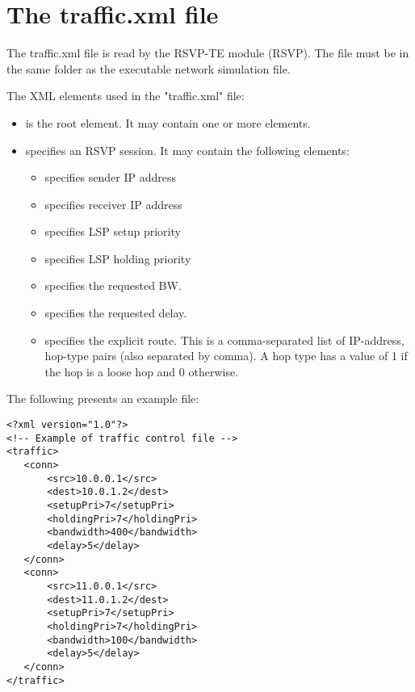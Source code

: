 \section{The traffic.xml file}

The traffic.xml file is read by the RSVP-TE module (RSVP).
The file must be in the same folder as the executable
network simulation file.

The XML elements used in the "traffic.xml" file:

\begin{itemize}
  \item {} is the root element. It may contain one or more  elements.
  \item {} specifies an RSVP session. It may contain the following elements:
  \begin{itemize}
    \item {} specifies sender IP address
    \item {} specifies receiver IP address
    \item {} specifies LSP setup priority
    \item {} specifies LSP holding priority
    \item {} specifies the requested BW.
    \item {} specifies the requested delay.
    \item {} specifies the explicit route. This is a comma-separated
      list of IP-address, hop-type pairs (also separated by comma).
      A hop type has a value of 1 if the hop is a loose hop and 0 otherwise.
  \end{itemize}
\end{itemize}

The following presents an example file:

\begin{verbatim}
<?xml version="1.0"?>
<!-- Example of traffic control file -->
<traffic>
   <conn>
       <src>10.0.0.1</src>
       <dest>10.0.1.2</dest>
       <setupPri>7</setupPri>
       <holdingPri>7</holdingPri>
       <bandwidth>400</bandwidth>
       <delay>5</delay>
   </conn>
   <conn>
       <src>11.0.0.1</src>
       <dest>11.0.1.2</dest>
       <setupPri>7</setupPri>
       <holdingPri>7</holdingPri>
       <bandwidth>100</bandwidth>
       <delay>5</delay>
   </conn>
</traffic>
\end{verbatim}

